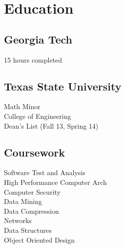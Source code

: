 \documentclass[letterpaper]{resume} %
\begin{document}
\begin{minipage}[t]{0.33\textwidth} %


\section{Education} 

\subsection{Georgia Tech}
15 hours completed\\ 

\sectionspace

\subsection{Texas State University}
Math Minor \\
College of Engineering \\
Dean's List (Fall 13, Spring 14) \\

\sectionspace %


\subsection{Coursework}

Software Test and Analysis \\
High Performance Computer Arch \\
Computer Security \\
Data Mining \\
Data Compression \\
Networks \\
Data Structures \\
Object Oriented Design

\sectionspace %


\end{minipage}
\end{document}
